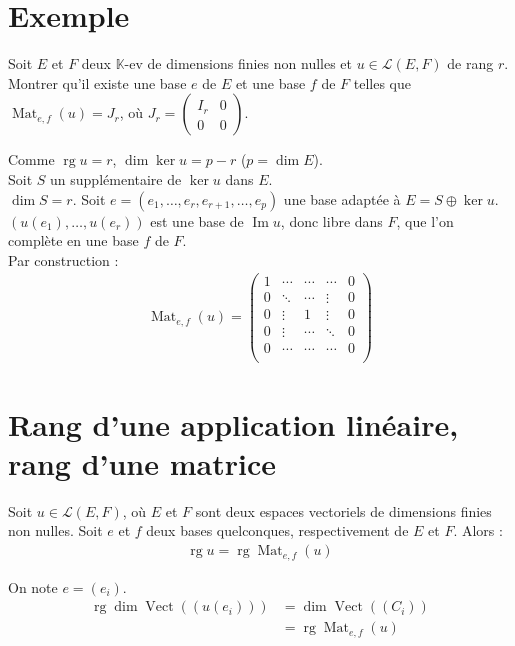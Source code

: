 \documentclass[../main.tex]{subfiles}
\begin{document}
\section{Exemple}
\begin{tcolorbox}[title=Exemple 28.29, title filled=false, colframe=darkgreen, colback=darkgreen!10!white]
    Soit $E$ et $F$ deux $\mathbb{K}$-ev de dimensions finies non nulles et $u\in \mathcal{L}(E, F)$ de rang $r$. \\
    Montrer qu'il existe une base $e$ de $E$ et une base $f$ de $F$ telles que $\operatorname{Mat}_{e,f}(u) = J_r$, où $J_r = \begin{pmatrix}
        I_r & 0 \\
        0 & 0
    \end{pmatrix}$. 
\end{tcolorbox}

\noindent Comme $\operatorname{rg} u = r$, $\dim \ker u = p - r$ ($p = \dim E$). \\
Soit $S$ un supplémentaire de $\ker u$ dans $E$. \\
$\dim S = r$. Soit $e = (e_1, \ldots, e_r, e_{r+1}, \ldots, e_p)$ une base adaptée à $E = S\oplus \ker u$. \\
$(u(e_1), \ldots, u(e_r))$ est une base de $\operatorname{Im} u$, donc libre dans $F$, que l'on complète en une base $f$ de $F$. \\
Par construction : 
\begin{align*}
    \operatorname{Mat}_{e,f}(u) = \begin{pmatrix}
        1 & \cdots & \cdots & \cdots & 0 \\
        0 & \ddots & \cdots & \vdots & 0 \\
        0 & \vdots & 1 & \vdots & 0 \\
        0 & \vdots & \cdots & \ddots & 0 \\
        0 & \cdots & \cdots & \cdots & 0 \\
    \end{pmatrix}
\end{align*}

\section{Rang d'une application linéaire, rang d'une matrice}
\begin{tcolorbox}[title=Propostion 28.33, title filled=false, colframe=lightblue, colback=lightblue!10!white]
    Soit $u\in \mathcal{L}(E, F)$, où $E$ et $F$ sont deux espaces vectoriels de dimensions finies non nulles. Soit $e$ et $f$ deux bases quelconques, respectivement de $E$ et $F$. Alors : 
    \begin{align*}
        \operatorname{rg} u = \operatorname{rg} \operatorname{Mat}_{e,f}(u)
    \end{align*}
\end{tcolorbox}

On note $e = (e_i)$. 
\begin{align*}
    \operatorname{rg} \dim \operatorname{Vect}((u(e_i)))
    &= \dim \operatorname{Vect} ((C_i)) \\
    &= \operatorname{rg} \operatorname{Mat}_{e,f}(u)
\end{align*}
\end{document}
